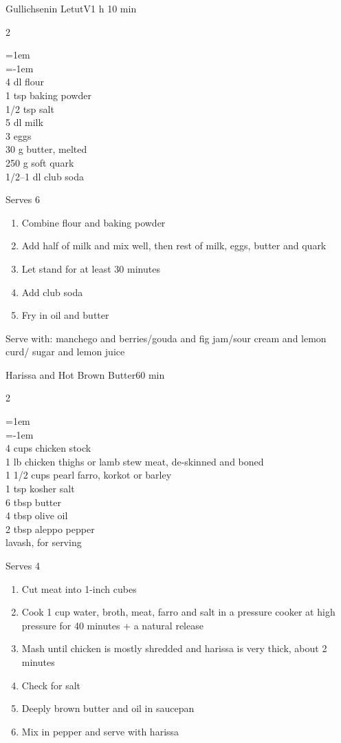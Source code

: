 \documentclass{article}
\newenvironment{recipe}[3][]
    {\begin{cardbase}[#1]{#2}{#3}
    \columnratio{0.333}
    \begin{paracol}{2}}
    {\end{paracol}\end{cardbase}}
\newcommand{\nextcolumn}{\switchcolumn}
\newenvironment{ingredients}
    {
    \begin{obeylines}
    \vspace{\parskip}
    \setlength{\parskip}{0.25em}
    \vspace{-0.25em}
    \leftskip=1em
    \parindent=-1em}
    {\end{obeylines}}
\newenvironment{steps}
    {\begin{enumerate}[leftmargin=*,topsep=0pt]}
    {\end{enumerate}}
\newcommand{\tag}[1]{\hspace{1em}#1}
\newcommand{\symboltag}[2]{\tag{#1\hspace{0.4em}#2}}
\newcommand{\totaltime}[1]{\symboltag{\raisebox{-0.1em}{\small\StopWatchEnd}}{#1}}
\begin{document}
\begin{recipe}{Gullichsenin Letut}{\tag{V}\totaltime{1 h 10 min}}
\begin{ingredients}
4 dl flour
1 tsp baking powder
1/2 tsp salt
5 dl milk
3 eggs
30 g butter, melted
250 g soft quark
1/2–1 dl club soda
\end{ingredients}
\nextcolumn
Serves 6
\begin{steps}
    \item Combine flour and baking powder
    \item Add half of milk and mix well, then rest of milk, eggs, butter and quark
    \item Let stand for at least 30 minutes
    \item Add club soda
    \item Fry in oil and butter
\end{steps}
Serve with: manchego and berries/gouda and fig jam/sour cream and lemon curd/ sugar and lemon juice
\end{recipe}

\begin{recipe}{Harissa and Hot Brown Butter}{\totaltime{60 min}}
\begin{ingredients}
4 cups chicken stock
1 lb chicken thighs or lamb stew meat, de-skinned and boned
1 1/2 cups pearl farro, korkot or barley
1 tsp kosher salt
6 tbsp butter
4 tbsp olive oil
2 tbsp aleppo pepper
lavash, for serving
\end{ingredients}
\nextcolumn
Serves 4
\begin{steps}
    \item Cut meat into 1-inch cubes
    \item Cook 1 cup water, broth, meat, farro and salt in a pressure cooker at high pressure for 40 minutes + a natural release
    \item Mash until chicken is mostly shredded and harissa is very thick, about 2 minutes
    \item Check for salt
    \item Deeply brown butter and oil in saucepan
    \item Mix in pepper and serve with harissa
\end{steps}
\end{recipe}
\end{document}
